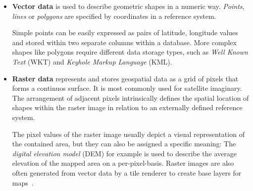\begin{itemize}

\item \textbf{Vector data} is used to describe geometric shapes in a numeric way. \textit{Points}, \textit{lines} or \textit{polygons} are specified by coordinates in a reference system.

Simple points can be easily expressed as pairs of latitude, longitude values and stored within two separate columns within a database. More complex shapes like polygons require different data storage types, such as \textit{Well Known Text} (WKT) and \textit{Keyhole Markup Language} (KML).

\item \textbf{Raster data} represents and stores geospatial data as a grid of pixels that forms a continuos surface. It is most commonly used for satellite imaginary. The arrangement of adjacent pixels intrinsically defines the spatial location of shapes within the raster image in relation to an externally defined reference system.

The pixel values of the raster image usually depict a visual representation of the contained area, but they can also be assigned a specific meaning: The \textit{digital elevation model} (DEM) for example is used to describe the average elevation of the mapped area on a per-pixel-basis. Raster images are also often generated from vector data by a tile renderer to create base layers for maps~\cite{Kupper2005lbs, Zzolo11mappingdrupal}.

\end{itemize}





